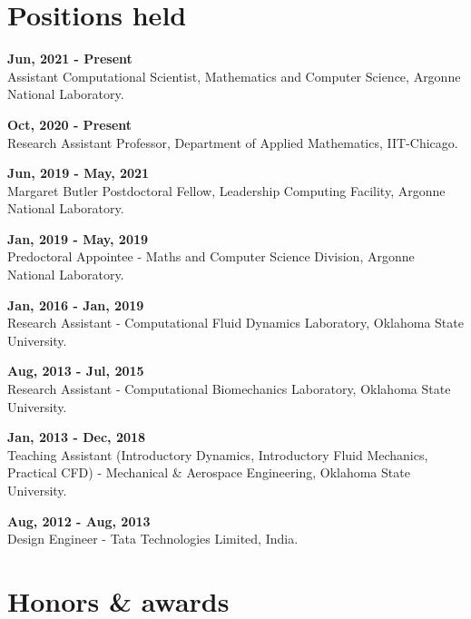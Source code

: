 \documentclass[letterpaper]{article}
\renewenvironment{itemize}{
  \begin{list}{}{
    \setlength{\leftmargin}{1.5em}
  }
}{
  \end{list}
}
\begin{document}
\section*{Positions held}
\begin{itemize}

\item  \textbf{Jun, 2021 - Present} \\ Assistant Computational Scientist, Mathematics and Computer Science, Argonne National Laboratory.

\item \textbf{Oct, 2020 - Present} \\ Research Assistant Professor, Department of Applied Mathematics, IIT-Chicago.

\item \textbf{Jun, 2019 - May, 2021} \\ Margaret Butler Postdoctoral Fellow, Leadership Computing Facility, Argonne National Laboratory.

\item \textbf{Jan, 2019 - May, 2019} \\ Predoctoral Appointee - Maths and Computer Science Division, Argonne National Laboratory.  

\item \textbf{Jan, 2016 - Jan, 2019} \\ Research Assistant - Computational Fluid Dynamics Laboratory, Oklahoma State University. 

\item \textbf{Aug, 2013 - Jul, 2015} \\ Research Assistant - Computational Biomechanics Laboratory, Oklahoma State University. 

\item  \textbf{Jan, 2013 - Dec, 2018} \\ Teaching Assistant (Introductory Dynamics, Introductory Fluid Mechanics, Practical CFD) - Mechanical \& Aerospace Engineering, Oklahoma State University.

\item \textbf{Aug, 2012 - Aug, 2013} \\ Design Engineer - Tata Technologies Limited, India. 
\end{itemize}

\section*{Honors \& awards}
\end{document}
